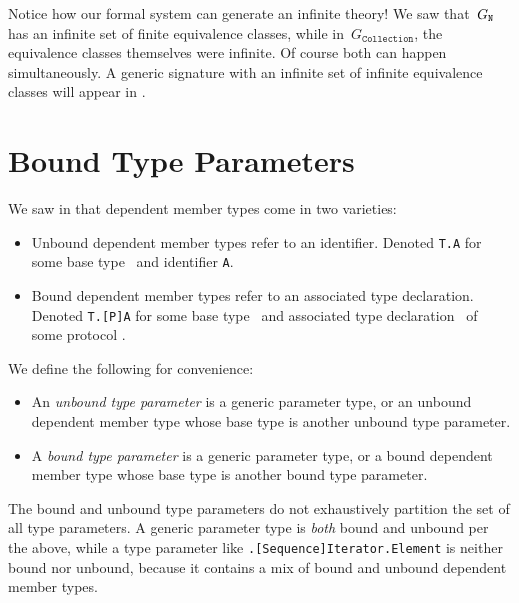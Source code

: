 \documentclass[../generics]{subfiles}
\begin{document}
Notice how our formal system can generate an infinite theory! We saw that~$G_{\texttt{N}}$ has an infinite set of finite equivalence classes, while in~$G_\texttt{Collection}$, the equivalence classes themselves were infinite. Of course both can happen simultaneously. A generic signature with an infinite set of infinite equivalence classes will appear in .

\section{Bound Type Parameters}\label{bound type params}

We saw in  that dependent member types come in two varieties:
\begin{itemize}
\item Unbound dependent member types refer to an identifier. Denoted \texttt{T.A} for some base type \tT\ and identifier \texttt{A}.
\item Bound dependent member types refer to an associated type declaration. Denoted \texttt{T.[P]A} for some base type \tT\ and associated type declaration \nA\ of some protocol \tP.
\end{itemize}

\begin{definition}
We define the following for convenience:
\begin{itemize}
\item An \emph{unbound type parameter} is a generic parameter type, or an unbound dependent member type whose base type is another unbound type parameter.

\item A \emph{bound type parameter} is a generic parameter type, or a bound dependent member type whose base type is another bound type parameter.
\end{itemize}
The bound and unbound type parameters do not exhaustively partition the set of all type parameters. A generic parameter type is \emph{both} bound and unbound per the above, while a type parameter like \texttt{\rT.[Sequence]Iterator.Element} is neither bound nor unbound, because it contains a mix of bound and unbound dependent member types.
\end{definition}
\end{document}
